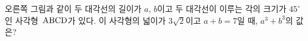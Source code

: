 \noindent\begin{minipage}[t]{0.58\linewidth}\vspace{0pt}\raggedright 오른쪽 그림과 같이 두 대각선의 길이가 $a$, $b$이고 두 대각선이 이루는 각의 크기가 $45^\circ$인 사각형~$\mathrm{ABCD}$가 있다. 이 사각형의 넓이가 $3\sqrt{2}$이고 $a+b=7$일 때, $a^{3}+b^{3}$의 값은?\end{minipage}\hfill\begin{minipage}[t]{0.4\linewidth}\vspace{0pt}\centering \resizebox{\ifdim\width>\linewidth\linewidth\else\width\fi}{!}{}\end{minipage}\par
{}
